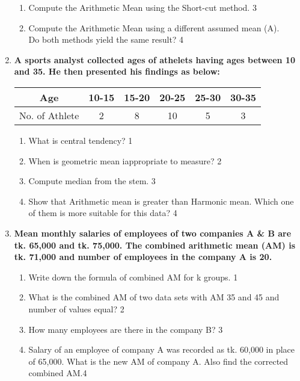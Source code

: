 \documentclass[a4paper,oneside]{book}
\begin{document}
\begin{enumerate}
\begin{enumerate}
    \item  
    Compute the Arithmetic Mean using the Short-cut method. \hfill 3
    \item
    Compute the Arithmetic Mean using a different assumed mean (A). \\
    Do both methods yield the same result? \hfill 4
\end{enumerate}

  
     \item
	  \textbf{A sports analyst collected ages of athelets having ages between 10 and 35. He then presented his findings as below:} 
	  
	  \begin{table}[h]
	    \centering
\begin{tabular}{c|c|c|c|c|c}
Age            & 10-15 & 15-20 & 20-25 & 25-30 & 30-35 \\ \hline
No. of Athlete & 2     & 8     & 10    & 5     & 3    
\end{tabular}
\end{table}
  
  \begin{enumerate}
    \item
	What is central tendency? \hfill 1
    \item
	When is geometric mean iappropriate to measure? \hfill 2
    \item  
	Compute median from the stem. \hfill 3
    \item
	Show that Arithmetic mean is greater than Harmonic mean. Which one of them is more suitable for this data? \hfill 4
  \end{enumerate}

   \item
	  \textbf{Mean monthly salaries of employees of two companies A \& B are tk. 
	  65,000 and tk. 75,000. The combined arithmetic mean (AM) is tk. 
	  71,000 and number of employees in the company A is 20.} 
	  
  \begin{enumerate}
    \item
	Write down the formula of combined AM for k groups. \hfill 1
    \item
	What is the combined AM of two data sets with AM 35 and 45 and number of values equal? \hfill 2
    \item  
	How many employees are there in the company B? \hfill 3
    \item
	Salary of an employee of company A was recorded as tk. 60,000 in place of
	65,000. What is the new AM of company A. Also find the corrected combined AM.\hfill 4
  \end{enumerate}


\end{enumerate}
\end{document}
